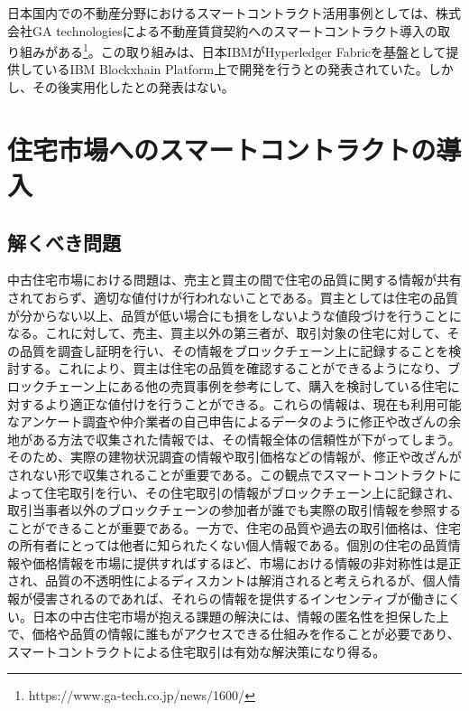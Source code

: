 \documentclass[a4paper,fontsize=11pt,report,notitlepage,line_length=38zw,number_of_lines=40,dvipdfmx]{jlreq}
\begin{document}
日本国内での不動産分野におけるスマートコントラクト活用事例としては、株式会社GA technologiesによる不動産賃貸契約へのスマートコントラクト導入の取り組みがある\footnote{https://www.ga-tech.co.jp/news/1600/}。この取り組みは、日本IBMがHyperledger Fabricを基盤として提供しているIBM Blockxhain Platform上で開発を行うとの発表されていた。しかし、その後実用化したとの発表はない。

\chapter{住宅市場へのスマートコントラクトの導入}
\section{解くべき問題}
中古住宅市場における問題は、売主と買主の間で住宅の品質に関する情報が共有されておらず、適切な値付けが行われないことである。買主としては住宅の品質が分からない以上、品質が低い場合にも損をしないような値段づけを行うことになる。これに対して、売主、買主以外の第三者が、取引対象の住宅に対して、その品質を調査し証明を行い、その情報をブロックチェーン上に記録することを検討する。これにより、買主は住宅の品質を確認することができるようになり、ブロックチェーン上にある他の売買事例を参考にして、購入を検討している住宅に対するより適正な値付けを行うことができる。これらの情報は、現在も利用可能なアンケート調査や仲介業者の自己申告によるデータのように修正や改ざんの余地がある方法で収集された情報では、その情報全体の信頼性が下がってしまう。そのため、実際の建物状況調査の情報や取引価格などの情報が、修正や改ざんがされない形で収集されることが重要である。この観点でスマートコントラクトによって住宅取引を行い、その住宅取引の情報がブロックチェーン上に記録され、取引当事者以外のブロックチェーンの参加者が誰でも実際の取引情報を参照することができることが重要である。一方で、住宅の品質や過去の取引価格は、住宅の所有者にとっては他者に知られたくない個人情報である。個別の住宅の品質情報や価格情報を市場に提供すればするほど、市場における情報の非対称性は是正され、品質の不透明性によるディスカントは解消されると考えられるが、個人情報が侵害されるのであれば、それらの情報を提供するインセンティブが働きにくい。日本の中古住宅市場が抱える課題の解決には、情報の匿名性を担保した上で、価格や品質の情報に誰もがアクセスできる仕組みを作ることが必要であり、スマートコントラクトによる住宅取引は有効な解決策になり得る。
\end{document}
